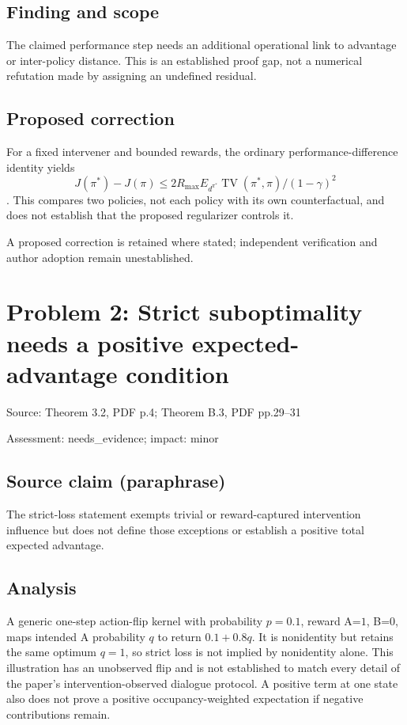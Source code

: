 \documentclass[11pt]{article}
\begin{document}
\subsection*{Finding and scope}

The claimed performance step needs an additional operational link to advantage or inter-policy distance. This is an established proof gap, not a numerical refutation made by assigning an undefined residual.

\subsection*{Proposed correction}

For a fixed intervener and bounded rewards, the ordinary performance-difference identity yields \[J(\pi^*)-J(\pi)\le2R_{\max}E_{d^{\pi^*}}\operatorname{TV}(\pi^*,\pi)/(1-\gamma)^2\]. This compares two policies, not each policy with its own counterfactual, and does not establish that the proposed regularizer controls it.

A proposed correction is retained where stated; independent verification and author adoption remain unestablished.

\section*{Problem 2: Strict suboptimality needs a positive expected-advantage condition}

Source: Theorem 3.2, PDF p.4; Theorem B.3, PDF pp.29–31

Assessment: needs\_evidence; impact: minor

\subsection*{Source claim (paraphrase)}

The strict-loss statement exempts trivial or reward-captured intervention influence but does not define those exceptions or establish a positive total expected advantage.

\subsection*{Analysis}

A generic one-step action-flip kernel with probability \(p=0.1\), reward A=\(1\), B=\(0\), maps intended A probability \(q\) to return \(0.1+0.8q\). It is nonidentity but retains the same optimum \(q=1\), so strict loss is not implied by nonidentity alone. This illustration has an unobserved flip and is not established to match every detail of the paper’s intervention-observed dialogue protocol. A positive term at one state also does not prove a positive occupancy-weighted expectation if negative contributions remain.
\end{document}
